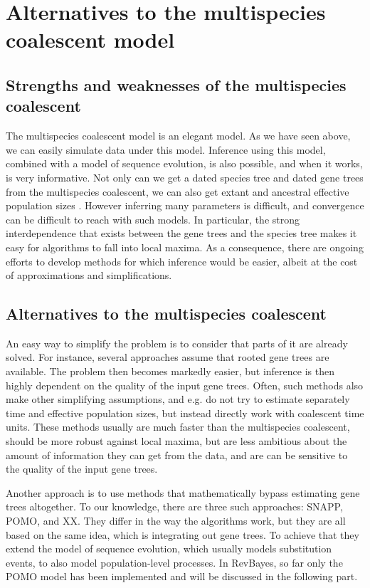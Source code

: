 \documentclass[11pt]{article}
\begin{document}
\bigskip
\section*{Alternatives to the multispecies coalescent model}
\subsection*{Strengths and weaknesses of the multispecies coalescent}

The multispecies coalescent model is an elegant model. 
As we have seen above, we can easily simulate data under this model.
Inference using this model, combined with a model of sequence evolution, is also possible, and when it works, is very informative.
Not only can we get a dated species tree and dated gene trees from the multispecies coalescent, we can also get extant and ancestral effective population sizes \citep{Liu, Heled}.
However inferring many parameters is difficult, and convergence can be difficult to reach with such models.
In particular, the strong interdependence that exists between the gene trees and the species tree makes it easy for algorithms to fall into local maxima.
As a consequence, there are ongoing efforts to develop methods for which inference would be easier, albeit at the cost of approximations and simplifications.

\subsection*{Alternatives to the multispecies coalescent}
An easy way to simplify the problem is to consider that parts of it are already solved.
For instance, several approaches assume that rooted gene trees are available.
The problem then becomes markedly easier, but inference is then highly dependent on the quality of the input gene trees. 
Often, such methods also make other simplifying assumptions, and e.g. do not try to estimate separately time and effective population sizes, but instead directly work with coalescent time units.
These methods usually are much faster than the multispecies coalescent, should be more robust against local maxima, but are less ambitious about the amount of information they can get from the data, and are can be sensitive to the quality of the input gene trees.

Another approach is to use methods that mathematically bypass estimating gene trees altogether.
To our knowledge, there are three such approaches: SNAPP\citep{Bryant}, POMO\citep{Demaio}, and XX\citep{Kubatko}.
They differ in the way the algorithms work, but they are all based on the same idea, which is integrating out gene trees.
To achieve that they extend the model of sequence evolution, which usually models substitution events, to also model population-level processes.
In RevBayes, so far only the POMO model has been implemented and will be discussed in the following part.
\end{document}
